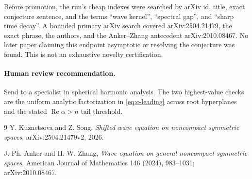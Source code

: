 \documentclass[11pt]{article}
\begin{document}
Before promotion, the run's cheap indexes were searched by arXiv id, title,
exact conjecture sentence, and the terms ``wave kernel'', ``spectral gap'',
and ``sharp time decay''.  A bounded primary arXiv search covered
arXiv:2504.21479, the exact phrase, the authors, and the Anker--Zhang
antecedent arXiv:2010.08467.  No later paper claiming this endpoint asymptotic
or resolving the conjecture was found.  This is not an exhaustive novelty
certification.

\paragraph{Human review recommendation.}
Send to a specialist in spherical harmonic analysis.  The two highest-value
checks are the uniform analytic factorization in \eqref{eq:c-leading} across
root hyperplanes and the stated $\operatorname{Re}\alpha>n$ tail threshold.

\begin{thebibliography}{9}
Y. Kuznetsova and Z. Song,
\emph{Shifted wave equation on noncompact symmetric spaces},
arXiv:2504.21479v2, 2026.

J.-Ph. Anker and H.-W. Zhang,
\emph{Wave equation on general noncompact symmetric spaces},
American Journal of Mathematics 146 (2024), 983--1031;
arXiv:2010.08467.
\end{thebibliography}
\end{document}
